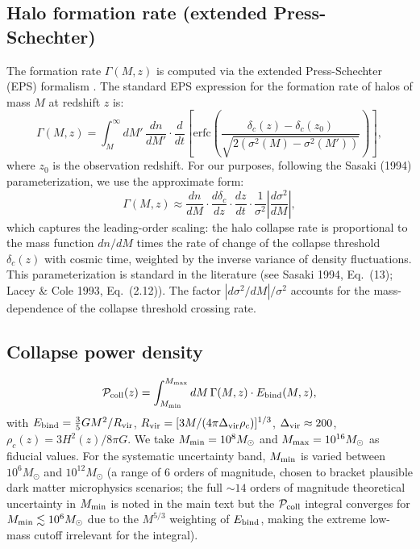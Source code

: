 \documentclass[aps,prd,onecolumn]{revtex4-2}
\begin{document}
\subsection{Halo formation rate (extended Press-Schechter)}

The formation rate $\Gamma(M,z)$ is computed via the extended Press-Schechter (EPS) formalism \cite{Lacey:1993,Sasaki:1994}. The standard EPS expression for the formation rate of halos of mass $M$ at redshift $z$ is:
\begin{equation}
\Gamma(M,z) = \int_M^\infty dM' \, \frac{dn}{dM'} \cdot \frac{d}{dt}\left[\mathrm{erfc}\left(\frac{\delta_c(z) - \delta_c(z_0)}{\sqrt{2(\sigma^2(M) - \sigma^2(M'))}}\right)\right],
\label{sm:eps_full}
\end{equation}
where $z_0$ is the observation redshift. For our purposes, following the Sasaki (1994) parameterization, we use the approximate form:
\begin{equation}
\Gamma(M,z) \approx \frac{dn}{dM} \cdot \frac{d\delta_c}{dz} \cdot \frac{dz}{dt} \cdot \frac{1}{\sigma^2}\left|\frac{d\sigma^2}{dM}\right|,
\label{sm:formation_rate}
\end{equation}
which captures the leading-order scaling: the halo collapse rate is proportional to the mass function $dn/dM$ times the rate of change of the collapse threshold $\delta_c(z)$ with cosmic time, weighted by the inverse variance of density fluctuations. This parameterization is standard in the literature (see Sasaki 1994, Eq.~(13); Lacey \& Cole 1993, Eq.~(2.12)). The factor $|d\sigma^2/dM|/\sigma^2$ accounts for the mass-dependence of the collapse threshold crossing rate.

\subsection{Collapse power density}

\begin{equation}
\mathcal{P}_{\rm coll}(z) = \int_{M_{\rm min}}^{M_{\rm max}} dM \, \Gamma(M,z) \cdot E_{\rm bind}(M,z),
\label{sm:pcoll_int}
\end{equation}
with $E_{\rm bind} = \frac{3}{5}GM^2/R_{\rm vir}$, $R_{\rm vir} = [3M/(4\pi\Delta_{\rm vir}\rho_c)]^{1/3}$, $\Delta_{\rm vir} \approx 200$, $\rho_c(z) = 3H^2(z)/8\pi G$. We take $M_{\rm min} = 10^8 M_\odot$ and $M_{\rm max} = 10^{16} M_\odot$ as fiducial values. For the systematic uncertainty band, $M_{\rm min}$ is varied between $10^6 M_\odot$ and $10^{12} M_\odot$ (a range of 6 orders of magnitude, chosen to bracket plausible dark matter microphysics scenarios; the full $\sim 14$ orders of magnitude theoretical uncertainty in $M_{\rm min}$ is noted in the main text but the $\mathcal{P}_{\rm coll}$ integral converges for $M_{\rm min} \lesssim 10^6 M_\odot$ due to the $M^{5/3}$ weighting of $E_{\rm bind}$, making the extreme low-mass cutoff irrelevant for the integral).
\end{document}
